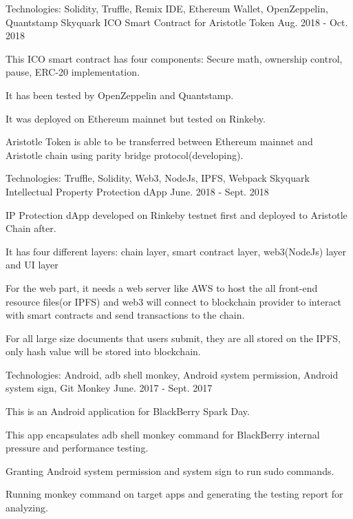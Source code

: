 \begin{cventries}
  \cventry
    {Technologies: \quad Solidity, Truffle, Remix IDE, Ethereum Wallet, OpenZeppelin, Quantstamp
    }
    {Skyquark ICO Smart Contract for Aristotle Token}
    {}
    {Aug. 2018 - Oct. 2018}
    {
      \begin{cvitems} 
        \item {This ICO smart contract has four components: Secure math, ownership control, pause, ERC-20 implementation.}
        \item {It has been tested by OpenZeppelin and Quantstamp.}
        \item {It was deployed on Ethereum mainnet but tested on Rinkeby.}
        \item {Aristotle Token is able to be transferred between Ethereum mainnet and Aristotle chain using parity bridge protocol(developing).}
      \end{cvitems}
    }

 
  \cventry
    {Technologies: \quad Truffle, Solidity, Web3, NodeJs, IPFS, Webpack
    }
    {Skyquark Intellectual Property Protection dApp}
    {}
    {June. 2018 - Sept. 2018}
    {
      \begin{cvitems}
        \item {IP Protection dApp developed on Rinkeby testnet first and deployed to Aristotle Chain after.}
        \item {It has four different layers: chain layer, smart contract layer, web3(NodeJs) layer and UI layer}
        \item {For the web part, it needs a web server like AWS to host the all front-end resource files(or IPFS) and web3 will connect to blockchain provider to interact with smart contracts and send transactions to the chain.}
        \item {For all large size documents that users submit, they are all stored on the IPFS, only hash value will be stored into blockchain.}
      \end{cvitems}
    }

  \cventry
    {Technologies: \quad Android, adb shell monkey, Android system permission, Android system sign, Git}
    {Monkey}
    {}
    {June. 2017 - Sept. 2017}
    {
      \begin{cvitems}
        \item {This is an Android application for BlackBerry Spark Day.}
        \item {This app encapsulates adb shell monkey command for BlackBerry internal pressure and performance testing.}
        \item {Granting Android system permission and system sign to run sudo commands.}
        \item {Running monkey command on target apps and generating the testing report for analyzing.}
      \end{cvitems}
    }
  

\end{cventries}
